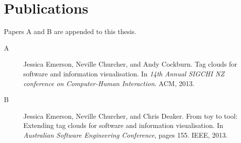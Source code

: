 \ifpdf
    \graphicspath{{Appendix4/Appendix4Figs/PNG/}{Appendix4/Appendix4Figs/PDF/}{Appendix4/Appendix4Figs/}}
\else
    \graphicspath{{Appendix4/Appendix4Figs/EPS/}{Appendix4/Appendix4Figs/}}
\fi  

\section{Publications}\label{appendx:d}

Papers A and B are appended to this thesis.

\begin{description}
\item[A] Jessica Emerson, Neville Churcher, and Andy Cockburn. Tag clouds for software
and information visualisation. In \emph{14th Annual SIGCHI NZ conference on
Computer-Human Interaction}. ACM, 2013.
\item[B] Jessica Emerson, Neville Churcher, and Chris Deaker. From toy to tool: Extending
tag clouds for software and information visualisation. In \emph{Australian
Software Engineering Conference}, pages 155. IEEE, 2013.
\end{description}







